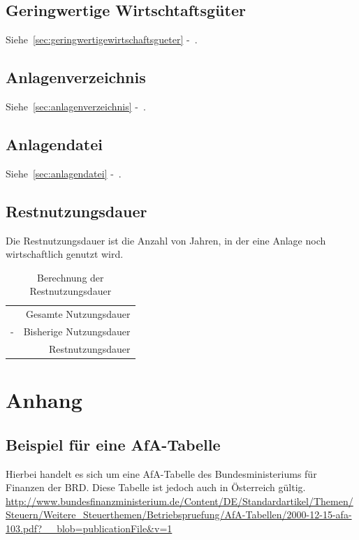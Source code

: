 \documentclass[a4paper,10pt]{report}
\begin{document}
\section{Geringwertige Wirtschtaftsgüter}
Siehe~\autoref{sec:geringwertigewirtschaftsgueter}
-~.

\section{Anlagenverzeichnis}
Siehe~\autoref{sec:anlagenverzeichnis}
-~.

\section{Anlagendatei}
Siehe~\autoref{sec:anlagendatei} -~.

\section{Restnutzungsdauer}
Die Restnutzungsdauer ist die Anzahl von Jahren, in der eine Anlage
noch wirtschaftlich genutzt wird.
\begin{table}[h]
  \centering
  \begin{tabular}{l r}
    & Gesamte Nutzungsdauer\\
    - & Bisherige Nutzungsdauer\\
    \hline
    & Restnutzungsdauer
  \end{tabular}
  \caption{Berechnung der Restnutzungsdauer}
\end{table}

\chapter{Anhang}
\thispagestyle{fancy}

\section{Beispiel für eine AfA-Tabelle}
\label{sec:afatabelle}
Hierbei handelt es sich um eine AfA-Tabelle des Bundesministeriums für
Finanzen der BRD. Diese Tabelle ist jedoch auch in Österreich gültig.\\
\url{http://www.bundesfinanzministerium.de/Content/DE/Standardartikel/Themen/Steuern/Weitere_Steuerthemen/Betriebspruefung/AfA-Tabellen/2000-12-15-afa-103.pdf?__blob=publicationFile&v=1}
\end{document}
